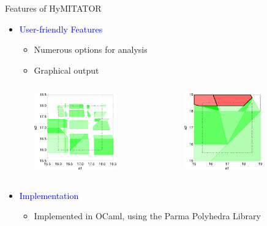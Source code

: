 \documentclass[final]{beamer}
\newcommand{\refer}[1]{\textcolor{blue}{\cite{#1}}}
\newcommand{\coulitem}[1]{\textcolor{blue}{#1}}
\newcommand{\hymitator}{HyMITATOR} %
\begin{document}
\begin{frame}{}
\begin{columns}[t]
\begin{column}{.45\linewidth}
\begin{block}{Features of \hymitator{}}
\begin{itemize}
	\item \coulitem{User-friendly Features}
	\begin{itemize}
		\item Numerous options for analysis
		\item Graphical output

		\begin{columns}
			\begin{column}{0.5\textwidth}
				\begin{center}
					\includegraphics[width=0.6\textwidth]{rhb_cart2.pdf}
				\end{center}
			\end{column}
			\begin{column}{0.5\textwidth}
				\begin{center}
					\includegraphics[width=0.6\textwidth]{good-bad.pdf}
				\end{center}
			\end{column}
		\end{columns}
		\end{itemize}

	\item \coulitem{Implementation}  \refer{AK12}
	\begin{itemize}
		\item Implemented in OCaml, using the Parma Polyhedra Library %
	\end{itemize}
\end{itemize}


\end{block}
\end{column}
\end{columns}
\end{frame}
\end{document}
